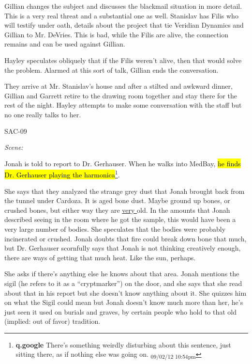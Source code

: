Gillian changes the subject and discusses the blackmail situation in more detail.  This is a very real threat and a substantial one as well.  Stanislav has Filis who will testify under oath, details about the project that tie Veridian Dynamics and Gillian to Mr. DeVries.  This is bad, while the Filis are alive, the connection remains and can be used against Gillian.



Hayley speculates obliquely that if the Filis weren't alive, then that would solve the problem.  Alarmed at this sort of talk, Gillian ends the conversation.



They arrive at Mr. Stanislav's house and after a stilted and awkward dinner, Gillian and Garrett retire to the drawing room together and stay there for the rest of the night.  Hayley attempts to make some conversation with the staff but no one really talks to her.



 {\LARGE SAC-09 } 



\textit{Scene:}

Jonah is told to report to Dr. Gerhauser.  When he walks into MedBay, \hl{he finds Dr. Gerhauser playing the harmonica}\footnote{\textbf{q.google }There's something weirdly disturbing about this sentence, just sitting there, as if nothing else was going on. \textsubscript{09/02/12 10:54pm}}.



She says that they analyzed the strange grey dust that Jonah brought back from the tunnel under Cardoza.  It is aged bone dust.  Maybe ground up bones, or crushed bones, but either way they are \underline{ very } old.  In the amounts that Jonah described seeing in the room where he got the sample, this would have been a very large number of bodies.  She speculates that the bodies were probably incinerated or crushed.  Jonah doubts that fire could break down bone that much, but Dr. Gerhauser scornfully says that Jonah is not thinking creatively enough, there are ways of getting that much heat.  Like the sun, perhaps.



She asks if there's anything else he knows about that area.  Jonah mentions the sigil (he refers to it as a ``cryptmarker'') on the door, and she says that she read about that in his report but she doesn't know anything about it.  She quizzes him on what the Sigil could mean but Jonah doesn't know much more than her, he's just seen it used on burials and graves, by certain people who hold to that old (implied: out of favor) tradition.



